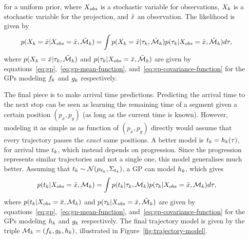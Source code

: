 for a uniform prior, where $X_{obs}$ is a stochastic variable for observations,
$X_{k}$ is a stochastic variable for the
projection, and $\bar{x}$ an observation. The likelihood is given by
\begin{equation}
  \label{eq:model-likelihood}
  p(X_{k} = \bar{x} \vert X_{obs} = \bar{x}, \tilde{\mathcal{M}}_{k}) =
  \int p(X_{k} = \bar{x} \vert \tau_{k}, \tilde{\mathcal{M}}_{k}) 
  p(\tau_{k} \vert X_{obs} = \bar{x}, \tilde{\mathcal{M}}_{k}) d\tau,
\end{equation}
where $p(X_{k} = \bar{x} \vert \tau_{k},
\tilde{\mathcal{M}}_{k})$ and $p(\tau_{k} \vert X_{obs} = \bar{x},
\tilde{\mathcal{M}}_{k})$ are given by equations~\ref{eq:gp},~\ref{eq:gp-mean-function},
and~\ref{eq:gp-covariance-function} for the GPs modeling
$f_{k}$ and $g_{k}$ respectively. 

The final piece is to make arrival time predictions. Predicting the
arrival time to the next stop can be seen as 
learning the remaining time of a segment given a certain position $(p_x, p_y)$ 
(as long as the current time is known). However, modeling it
as simple as as function of $(p_x, p_y)$ directly would assume that 
every trajectory passes the \textit{exact} same positions. A better model is $t_{k}
= h_{k}(\tau)$, for arrival time $t_{k}$, 
which instead depends on progression. Since the
progression represents similar trajectories and not a single one, this
model generalises much better. Assuming that $t_{k} \sim
\mathcal{N}(\mu_{t_{k}}, \Sigma_{t_{k}})$, a GP can model
$h_{k}$, which gives
\begin{equation}
  \label{eq:arrival-time-probability}
  p(t_{k} \vert X_{obs} = \bar{x}, \mathcal{M}_k) 
  = \int p(t_{k} \vert \tau_{k},
  \mathcal{M}_{k}) p(\tau_{k} \vert X_{obs} 
  = \bar{x}, \mathcal{M}_{k}) d\tau,
\end{equation}
where $p(t_{k} \vert X_{obs} = \bar{x}, \mathcal{M}_k)$
and $p(\tau_{k} \vert X_{obs} = \bar{x},
\tilde{\mathcal{M}}_{k})$ are given by equations~\ref{eq:gp},~\ref{eq:gp-mean-function},
and~\ref{eq:gp-covariance-function} for the GPs modeling
$h_{k}$ and $g_{k}$ respectively. 
The final trajectory model is given by the triple $\mathcal{M}_{k} = (f_{k}, g_{k}, h_{k})$, illustrated in Figure~\ref{fig:trajectory-model}.

